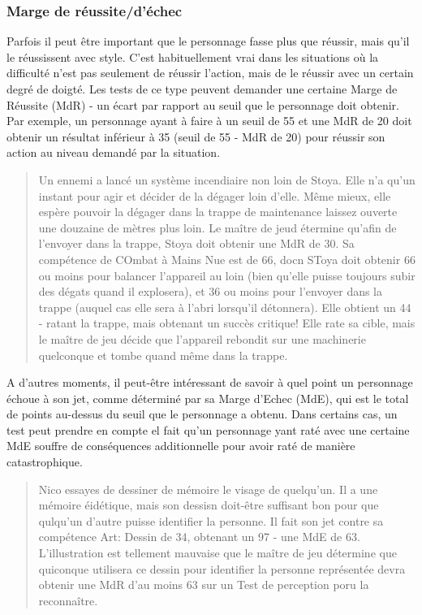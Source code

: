 \subsubsection{Marge de réussite/d'échec} \label{sec:marg-succ} 

Parfois il peut être important que le personnage fasse plus que réussir, mais qu'il le réussissent avec style. C'est habituellement vrai dans les situations où la difficulté n'est pas seulement de réussir l'action, mais de le réussir avec un certain degré de doigté. Les tests de ce type peuvent demander une certaine Marge de Réussite (MdR) - un écart par rapport au seuil que le personnage doit obtenir. Par exemple, un personnage ayant à faire à un seuil de 55 et une MdR de 20 doit obtenir un résultat inférieur à 35 (seuil de 55 - MdR de 20) pour réussir son action au niveau demandé par la situation. 

\begin{quotation} Un ennemi a lancé un système incendiaire non loin de Stoya. Elle n'a qu'un instant pour agir et décider de la dégager loin d'elle. Même mieux, elle espère pouvoir la dégager dans la trappe de maintenance laissez ouverte une douzaine de mètres plus loin. Le maître de jeud étermine qu'afin de l'envoyer dans la trappe, Stoya doit obtenir une MdR de 30. Sa compétence de COmbat à Mains Nue est de 66, docn SToya doit obtenir 66 ou moins pour balancer l'appareil au loin (bien qu'elle puisse toujours subir des dégats quand il explosera), et 36 ou moins pour l'envoyer dans la trappe (auquel cas elle sera à l'abri lorsqu'il détonnera). Elle obtient un 44 - ratant la trappe, mais obtenant un succès critique! Elle rate sa cible, mais le maître de jeu décide que l'appareil rebondit sur une machinerie quelconque et tombe quand même dans la trappe. \end{quotation} 

A d'autres moments, il peut-être intéressant de savoir à quel point un personnage échoue à son jet, comme déterminé par sa Marge d'Echec (MdE), qui est le total de points au-dessus du seuil que le personnage a obtenu. Dans certains cas, un test peut prendre en compte el fait qu'un personnage yant raté avec une certaine MdE souffre de conséquences additionnelle pour avoir raté de manière catastrophique. 

\begin{quotation} Nico essayes de dessiner de mémoire le visage de quelqu'un. Il a une mémoire éidétique, mais son dessisn doit-être suffisant bon pour que qulqu'un d'autre puisse identifier la personne. Il fait son jet contre sa compétence Art: Dessin de 34, obtenant un 97 - une MdE de 63. L'illustration est tellement mauvaise que le maître de jeu détermine que quiconque utilisera ce dessin pour identifier la personne représentée devra obtenir une MdR d'au moins 63 sur un Test de perception poru la reconnaître. \end{quotation} 

